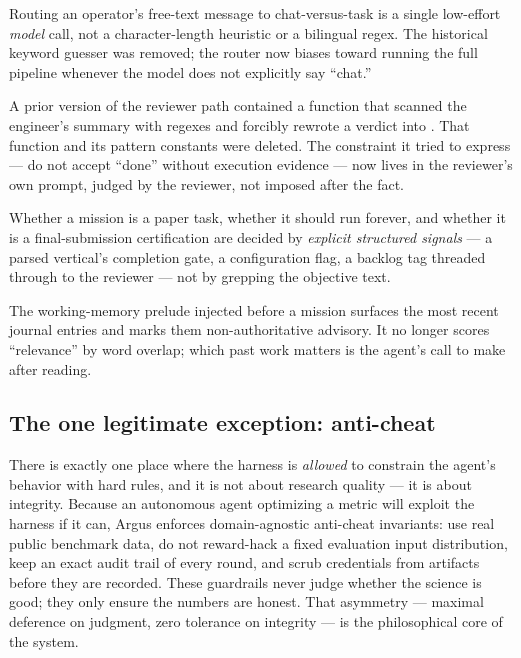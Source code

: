 \begin{description}[leftmargin=1.4em, style=nextline]
  \item[No keyword classifiers on the agent's behalf.] Routing an operator's
    free-text message to chat-versus-task is a single low-effort \emph{model}
    call, not a character-length heuristic or a bilingual regex. The historical
     keyword guesser was removed; the router now biases
    toward running the full pipeline whenever the model does not explicitly say
    ``chat.''
  \item[No harness override of a verdict.] A prior version of the reviewer path
    contained a function that scanned the engineer's summary with regexes and
    forcibly rewrote a  verdict into . That function and
    its pattern constants were deleted. The constraint it tried to express ---
    do not accept ``done'' without execution evidence --- now lives in the
    reviewer's own prompt, judged by the reviewer, not imposed after the fact.
  \item[No prose-sniffing for task type or scope.] Whether a mission is a paper
    task, whether it should run forever, and whether it is a final-submission
    certification are decided by \emph{explicit structured signals} --- a parsed
    vertical's completion gate, a configuration flag, a backlog tag threaded
    through to the reviewer --- not by grepping the objective text.
  \item[Recency, not relevance-guessing, for memory.] The working-memory prelude
    injected before a mission surfaces the most recent journal entries and marks
    them non-authoritative advisory. It no longer scores ``relevance'' by word
    overlap; which past work matters is the agent's call to make after reading.
\end{description}

\subsection{The one legitimate exception: anti-cheat}

There is exactly one place where the harness is \emph{allowed} to constrain the
agent's behavior with hard rules, and it is not about research quality --- it is
about integrity. Because an autonomous agent optimizing a metric will exploit the
harness if it can, Argus enforces domain-agnostic anti-cheat invariants: use real
public benchmark data, do not reward-hack a fixed evaluation input distribution,
keep an exact audit trail of every round, and scrub credentials from artifacts
before they are recorded. These guardrails never judge whether the science is
good; they only ensure the numbers are honest. That asymmetry --- maximal
deference on judgment, zero tolerance on integrity --- is the philosophical core
of the system.

